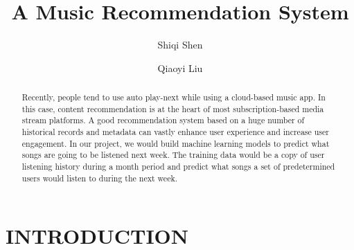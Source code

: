 \documentclass[sigconf]{acmart}
\begin{document}
\title{A Music Recommendation System}

\author{Shiqi Shen}

\author{Qiaoyi Liu}

\begin{abstract}

Recently, people tend to use auto play-next while using a cloud-based music app. In this case, content recommendation is at the heart of most subscription-based media stream platforms. A good recommendation system based on a huge number of historical records and metadata can vastly enhance user experience and increase user engagement. In our project, we would build machine learning models to predict what songs are going to be listened next week. The training data would be a copy of user listening history during a month period and predict what songs a set of predetermined users would listen to during the next week. 

\end{abstract}


\maketitle

\section{INTRODUCTION}
\end{document}
